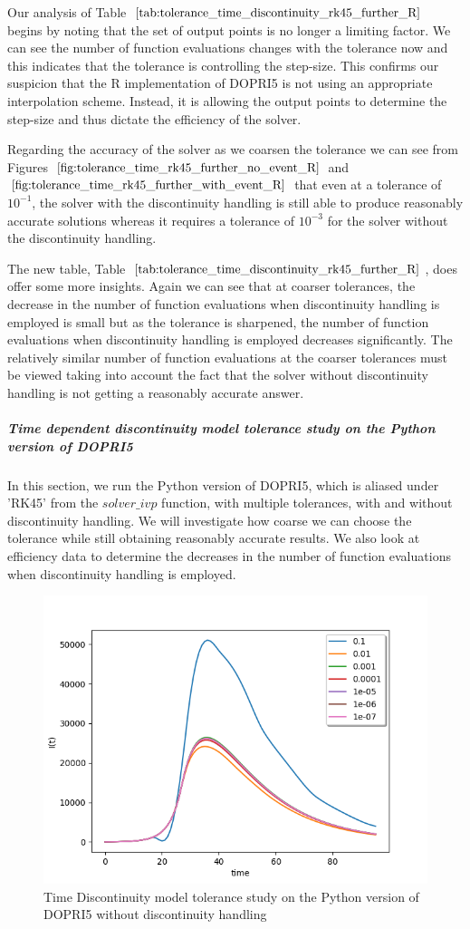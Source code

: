 Our analysis of Table $\ref{tab:tolerance_time_discontinuity_rk45_further_R}$ begins by noting that the set of output points is no longer a limiting factor. We can see the number of function evaluations changes with the tolerance now and this indicates that the tolerance is controlling the step-size. This confirms our suspicion that the R implementation of DOPRI5 is not using an appropriate interpolation scheme. Instead, it is allowing the output points to determine the step-size and thus dictate the efficiency of the solver.

Regarding the accuracy of the solver as we coarsen the tolerance we can see from Figures $\ref{fig:tolerance_time_rk45_further_no_event_R}$ and $\ref{fig:tolerance_time_rk45_further_with_event_R}$ that even at a tolerance of $10^{-1}$, the solver with the discontinuity handling is still able to produce reasonably accurate solutions whereas it requires a tolerance of $10^{-3}$ for the solver without the discontinuity handling.

The new table, Table $\ref{tab:tolerance_time_discontinuity_rk45_further_R}$, does offer some more insights. Again we can see that at coarser tolerances, the decrease in the number of function evaluations when discontinuity handling is employed is small but as the tolerance is sharpened, the number of function evaluations when discontinuity handling is employed decreases significantly. The relatively similar number of function evaluations at the coarser tolerances must be viewed taking into account the fact that the solver without discontinuity handling is not getting a reasonably accurate answer. 

\subparagraph{Time dependent discontinuity model tolerance study on the Python version of DOPRI5}
In this section, we run the Python version of DOPRI5, which is aliased under 'RK45' from the $solver\_ivp$ function, with multiple tolerances, with and without discontinuity handling. We will investigate how coarse we can choose the tolerance while still obtaining reasonably accurate results. We also look at efficiency data to determine the decreases in the number of function evaluations when discontinuity handling is employed.

\begin{figure}[H]
\centering
\includegraphics[width=0.7\linewidth]{./figures/tolerance_time_rk45_no_event_py}
\caption{Time Discontinuity model tolerance study on the Python version of DOPRI5 without discontinuity handling}
\label{fig:tolerance_time_rk45_no_event_py}
\end{figure}

